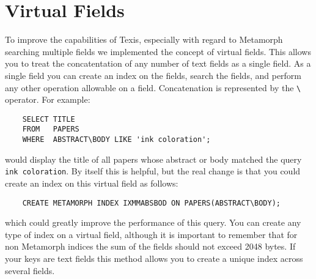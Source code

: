 \section{Virtual Fields}

To improve the capabilities of Texis, especially with regard to Metamorph
searching multiple fields we implemented the concept of virtual fields.
This allows you to treat the concatentation of any number of text fields
as a single field.  As a single field you can create an index on the fields,
search the fields, and perform any other operation allowable on a field.
Concatenation is represented by the \verb`\` operator.  For example:

\begin{verbatim}
	SELECT TITLE
	FROM   PAPERS
	WHERE  ABSTRACT\BODY LIKE 'ink coloration';
\end{verbatim}

would display the title of all papers whose abstract or body matched the
query \verb`ink coloration`.  By itself this is helpful, but the real
change is that you could create an index on this virtual field as follows:

\begin{verbatim}
	CREATE METAMORPH INDEX IXMMABSBOD ON PAPERS(ABSTRACT\BODY);
\end{verbatim}

which could greatly improve the performance of this query.  You can create
any type of index on a virtual field, although it is important to remember
that for non Metamorph indices the sum of the fields should not exceed
2048 bytes.  If your keys are text fields this method allows you to create
a unique index across several fields.
